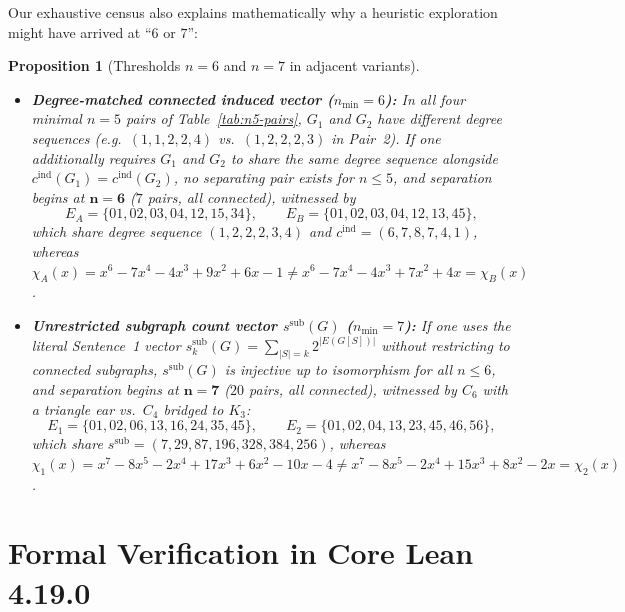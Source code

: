 \documentclass[11pt]{article}
\newtheorem{proposition}[theorem]{Proposition}
\theoremstyle{definition}
\newcommand{\cind}{c^{\mathrm{ind}}}
\newcommand{\ssub}{s^{\mathrm{sub}}}
\begin{document}
Our exhaustive census also explains mathematically why a heuristic exploration might have arrived at ``$6$ or $7$'':
\begin{proposition}[Thresholds $n = 6$ and $n = 7$ in adjacent variants]
\label{prop:diagnostic}
\leavevmode
\begin{itemize}
  \item[(a)] \textbf{Degree-matched connected induced vector ($n_{\min} = 6$):} In all four minimal $n = 5$ pairs of Table~\ref{tab:n5-pairs}, $G_1$ and $G_2$ have \emph{different} degree sequences (e.g.\ $(1,1,2,2,4)$ vs.\ $(1,2,2,2,3)$ in Pair~2). If one additionally requires $G_1$ and $G_2$ to share the same degree sequence alongside $\cind(G_1) = \cind(G_2)$, no separating pair exists for $n \le 5$, and separation begins at $\mathbf{n = 6}$ ($7$ pairs, all connected), witnessed by
  \[
    E_A = \{01,02,03,04,12,15,34\}, \qquad E_B = \{01,02,03,04,12,13,45\},
  \]
  which share degree sequence $(1,2,2,2,3,4)$ and $\cind = (6,7,8,7,4,1)$, whereas $\chi_A(x) = x^6 - 7x^4 - 4x^3 + 9x^2 + 6x - 1 \ne x^6 - 7x^4 - 4x^3 + 7x^2 + 4x = \chi_B(x)$.
  \item[(b)] \textbf{Unrestricted subgraph count vector $\ssub(G)$ ($n_{\min} = 7$):} If one uses the literal Sentence~1 vector $\ssub_k(G) = \sum_{|S|=k} 2^{|E(G[S])|}$ \emph{without} restricting to connected subgraphs, $\ssub(G)$ is injective up to isomorphism for all $n \le 6$, and separation begins at $\mathbf{n = 7}$ ($20$ pairs, all connected), witnessed by $C_6$ with a triangle ear vs.\ $C_4$ bridged to $K_3$:
  \[
    E_1 = \{01,02,06,13,16,24,35,45\}, \qquad E_2 = \{01,02,04,13,23,45,46,56\},
  \]
  which share $\ssub = (7, 29, 87, 196, 328, 384, 256)$, whereas $\chi_1(x) = x^7 - 8x^5 - 2x^4 + 17x^3 + 6x^2 - 10x - 4 \ne x^7 - 8x^5 - 2x^4 + 15x^3 + 8x^2 - 2x = \chi_2(x)$.
\end{itemize}
\end{proposition}

\section{Formal Verification in Core Lean 4.19.0}
\end{document}
